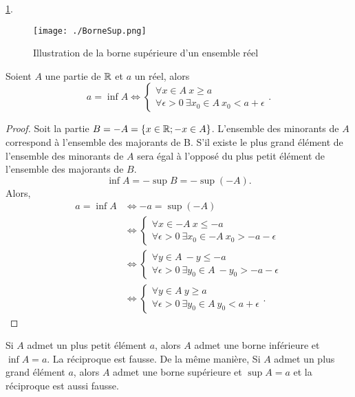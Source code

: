 \ref{fig:BorneSup}.
\begin{figure}[h]
    \centering
    \texttt{[image: ./BorneSup.png]}
    \caption{Illustration de la borne supérieure d'un ensemble réel}
    \label{fig:BorneSup}
\end{figure}
\begin{theo}
  Soient \(A\) une partie de \(\mathbb{R}\) et \(a\) un réel, alors
  \begin{equation}
    a=\inf A \iff \begin{cases} \forall x \in A \ x\geqslant a \\  \forall \epsilon >0 \ \exists x_0\in A \ x_0<a+\epsilon\end{cases}.
  \end{equation}
\end{theo}
\begin{proof}
  Soit la partie \(B=-A=\{x\in\mathbb{R}; -x\in A\}\). L'ensemble des minorants de \(A\) correspond à l'ensemble des majorants de B. S'il existe le plus grand élément de l'ensemble des minorants de \(A\) sera égal à l'opposé du plus petit élément de l'ensemble des majorants de \(B\).
  \begin{equation}
    \inf A=-\sup B=-\sup(-A).
  \end{equation}
Alors,
\begin{align}
  a=\inf A &\iff -a=\sup(-A)\\
  &\iff \begin{cases} \forall x \in -A \ x\leqslant -a \\ \forall \epsilon>0 \ \exists x_0 \in -A \ x_0>-a-\epsilon \end{cases}\\
  &\iff \begin{cases} \forall y \in A \ -y\leqslant -a \\ \forall \epsilon>0 \ \exists y_0 \in A \ -y_0>-a-\epsilon \end{cases}\\
  &\iff \begin{cases} \forall y \in A \ y\geqslant a \\ \forall \epsilon>0 \ \exists y_0 \in A \ y_0<a+\epsilon \end{cases}.
\end{align}
\end{proof}

Si \(A\) admet un plus petit élément \(a\), alors \(A\) admet une borne inférieure et \(\inf A=a\). La réciproque est fausse. De la même manière, Si \(A\) admet un plus grand élément \(a\), alors \(A\) admet une borne supérieure et \(\sup A=a\) et la réciproque est aussi fausse.

